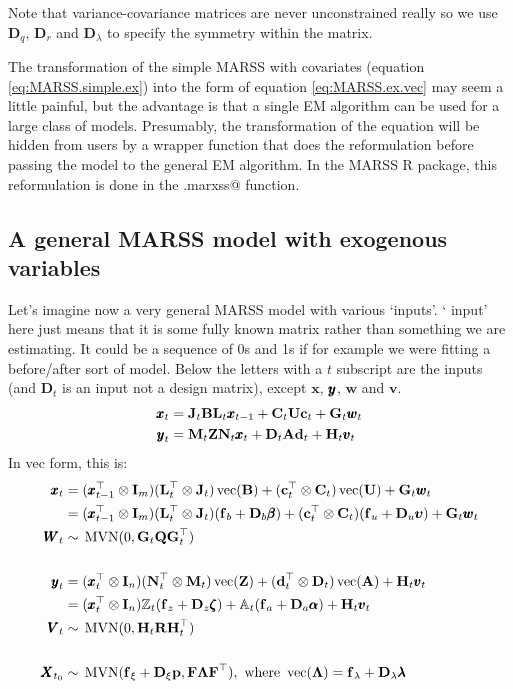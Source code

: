 \documentclass[]{article}
\def\uupsilon{\pmb{\upsilon}}
\def\llambda{\pmb{\lambda}}
\def\bbeta{\pmb{\beta}}
\def\aalpha{\pmb{\alpha}}
\def\zzeta{\pmb{\zeta}}
\def\PI{\mbox{\boldmath $\Pi$}}
\def\LAM{\mbox{\boldmath $\Lambda$}}
\def\UPS{\mbox{\boldmath $\Upsilon$}}
\def\XI{\mbox{\boldmath $\Xi$}}
\def\ZZ{\mbox{$\mathbf Z$}}	\def\zz{\mbox{$\mathbf z$}}
\def\AA{\mbox{$\mathbf A$}}	\def\aa{\mbox{$\mathbf a$}}
\def\BB{\mbox{$\mathbf B$}}	\def\bb{\mbox{$\mathbf b$}}
\def\DD{\mbox{$\mathbf D$}}	\def\dd{\mbox{$\mathbf d$}}
\def\FF{\mbox{$\mathbf F$}} \def\ff{\mbox{$\mathbf f$}}
\def\II{\mbox{$\mathbf I$}} \def\ii{\mbox{$\mathbf i$}}
\def\QQ{\mbox{$\mathbf Q$}}	 \def\qq{\mbox{$\mathbf q$}}
\def\Qb{\mbox{$\mathbf G$}}  \def\Qm{\mathbb{Q}}
\def\RR{\mbox{$\mathbf R$}}	 \def\rr{\mbox{$\mathbf r$}}
\def\Rb{\mbox{$\mathbf H$}}	\def\Rm{\mathbb{R}}
\def\UU{\mbox{$\mathbf U$}}	\def\uu{\mbox{$\mathbf u$}}
\def\Ub{\mbox{$\mathbf C$}} \def\Ua{\mbox{$\mathbf c$}} \def\Um{\UPS}
\def\VV{\mbox{$\pmb{V}$}}	\def\vv{\mbox{$\pmb{v}$}}
\def\WW{\mbox{$\pmb{W}$}}	\def\ww{\mbox{$\pmb{w}$}}
\def\XX{\mbox{$\pmb{X}$}}	\def\xx{\mbox{$\pmb{x}$}}
\def\Ab{\mbox{$\mathbf D$}} \def\Aa{\mbox{$\mathbf d$}} \def\Am{\PI}
\def\Ba{\mbox{$\mathbf L$}} \def\Bm{\UPS} \def\Bb{\mbox{$\mathbf J$}}
\def\Za{\mbox{$\mathbf N$}} \def\Zm{\XI}
\def\Zb{\mbox{$\mathbf M$}}
\def\vec{\,\textup{\textrm{vec}}}
\def\MVN{\,\textup{\textrm{MVN}}}
\begin{document}
Note that variance-covariance matrices are never unconstrained really so we use $\DD_q$, $\DD_r$ and $\DD_\lambda$ to specify the symmetry within the matrix.

The transformation of the simple MARSS with covariates (equation \ref{eq:MARSS.simple.ex}) into the form of equation \ref{eq:MARSS.ex.vec} may seem a little painful, but the advantage is that a single  EM algorithm can be used for a large class of models.  Presumably, the transformation of the equation will be hidden from users by a wrapper function that does the reformulation before passing the model to the general EM algorithm.  In the MARSS R package, this reformulation is done in the \verb@MARSS.marxss@ function.

\subsection{A general MARSS model with exogenous variables}
Let's imagine now a very general MARSS model with various `inputs'.  `
input' here just means that it is some fully known matrix rather than something we are estimating.  It could be a sequence of 0s and 1s if for example we were fitting a before/after sort of model.  Below the letters with a $t$ subscript are the inputs (and $\Ab_t$ is an input not a design matrix), except $\xx$, $\mbox{$\pmb{y}$}$, $\ww$ and $\vv$.
\begin{equation}\label{eq:MARSS.general.ex}
\begin{split}
\xx_t &= \Bb_t\BB\Ba_t\xx_{t-1} + \Ub_t\UU\Ua_t + \Qb_t\ww_t\\
\yy_t &= \Zb_t\ZZ\Za_t\xx_t + \Ab_t\AA\Aa_t + \Rb_t\vv_t 
\end{split}
\end{equation}
In vec form, this is:
\begin{equation}\label{eq:MARSS.ex3}
\begin{split}
\xx_t &= (\xx_{t-1}^\top \otimes \II_m)(\Ba_t^\top \otimes \Bb_t)\vec(\BB) + (\Ua_t^\top \otimes \Ub_t)\vec(\UU)
+ \Qb_t\ww_t\\
&= (\xx_{t-1}^\top \otimes \II_m)(\Ba_t^\top \otimes \Bb_t)(\ff_b+\DD_b\bbeta) + (\Ua_t^\top \otimes \Ub_t)(\ff_u + \DD_u\uupsilon) + \Qb_t\ww_t\\
\WW_t & \sim \MVN(0,\Qb_t\QQ\Qb_t^\top)\\
\\ 
\yy_t &= (\xx_t^\top \otimes \II_n)(\Za_t^\top \otimes \Zb_t)\vec(\ZZ) + (\Aa_t^\top \otimes \Ab_t)\vec(\AA) + \Rb_t\vv_t \\
&= (\xx_t^\top \otimes \II_n)\mathbb{Z}_t(\ff_z+\DD_z\zzeta) + \mathbb{A}_t(\ff_a+\DD_a\aalpha) + \Rb_t\vv_t \\
\VV_t &\sim \MVN(0,\Rb_t\RR\Rb_t^\top)\\
\\
\XX_{t_0} &\sim \MVN(\ff_\xi+\DD_\xi\pp,\FF\LAM\FF^\top), \text{ where } \vec(\LAM)=\ff_\lambda+\DD_\lambda\llambda
\end{split}
\end{equation}
\end{document}
